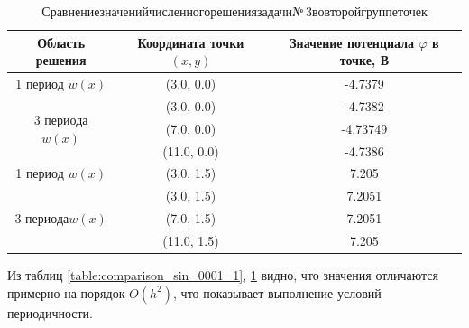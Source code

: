 \documentclass[12pt, a4paper]{article}
\renewcommand{\phi}{\varphi}
\begin{document}
			
			
			
			\begin{table}[!h]
				\centering
				\caption{ Сравнение\;значений\;численного\;решения\;задачи\;№\,3\;во\;второй\;группе\;точек 
				}
				\vspace*{2mm}
				\begin{tabular}{|c|c|c|}
					\hline
					Область решения
					& Координата точки $(x, y)$
					& Значение потенциала $\phi$ в точке, В\\
					
					\hline
					\hline
					
					1 период $w(x)$                   
					& (3.0, 0.0)                                                       
					& -4.7379         \\ 
					\hline
					\multirow{3}{*}{3 периода $w(x)$} 
					& (3.0, 0.0)                                                       
					& -4.7382        \\ 
					
					\cline{2-3} 
					& (7.0, 0.0)                                                       
					& -4.73749         \\ \cline{2-3} 
					& (11.0, 0.0)                                                      
					& -4.7386        \\ 
					
					\hline
					\hline
					
					1 период $w(x)$                   
					& (3.0, 1.5)              
					& 7.205          \\ 
					\hline
					
					\multirow{3}{*}{3 периода$ w(x)$} 
					& (3.0, 1.5)              
					& 7.2051         \\ 
					\cline{2-3} 
					
					& (7.0, 1.5)              
					& 7.2051          \\ 
					\cline{2-3} 
					
					& (11.0, 1.5)             
					& 7.205          \\ 
					\hline
					
				
				\end{tabular}
				\label{table:comparison_sin_0001_2}
			\end{table}
			
			Из таблиц \ref{table:comparison_sin_0001_1}, \ref{table:comparison_sin_0001_2} видно, что значения отличаются примерно на порядок $O(h^2)$, что показывает выполнение условий периодичности.
			
\end{document}
